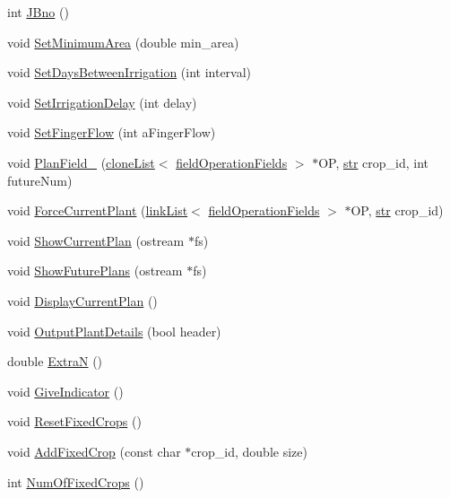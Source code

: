 \begin{DoxyCompactItemize}
\item 
int \hyperlink{classfield_aa93627cc48e5c33da7ce60ef2b06fb91}{JBno} ()
\item 
void \hyperlink{classfield_a94bf6bbab5235c10e3f495fbd4120cda}{SetMinimumArea} (double min\_\-area)
\item 
void \hyperlink{classfield_a56772aae8a615014781dbd3b400f812a}{SetDaysBetweenIrrigation} (int interval)
\item 
void \hyperlink{classfield_a5997f5906b29b4f9ebf81965c239d1b2}{SetIrrigationDelay} (int delay)
\item 
void \hyperlink{classfield_af7c73512be5fcf494c02139c141af5ea}{SetFingerFlow} (int aFingerFlow)
\item 
void \hyperlink{classfield_a2943f6f16de6cd14db847055cf7a6f0e}{PlanField\_\-} (\hyperlink{classclone_list}{cloneList}$<$ \hyperlink{classfield_operation_fields}{fieldOperationFields} $>$ $\ast$OP, \hyperlink{classfield_a6f1744c3ac290d5fc0ef66302c0ec632}{str} crop\_\-id, int futureNum)
\item 
void \hyperlink{classfield_a025a74a5935f44df084705be722fb0da}{ForceCurrentPlant} (\hyperlink{classlink_list}{linkList}$<$ \hyperlink{classfield_operation_fields}{fieldOperationFields} $>$ $\ast$OP, \hyperlink{classfield_a6f1744c3ac290d5fc0ef66302c0ec632}{str} crop\_\-id)
\item 
void \hyperlink{classfield_afa0f5c8b78d3aa7ca1f1788ee957df52}{ShowCurrentPlan} (ostream $\ast$fs)
\item 
void \hyperlink{classfield_ad6338ef1402d2bfa7837678ab9f79f41}{ShowFuturePlans} (ostream $\ast$fs)
\item 
void \hyperlink{classfield_a5c05b940e58b24dae910654ee8a4eca0}{DisplayCurrentPlan} ()
\item 
void \hyperlink{classfield_a15884755ee5efe058ae4dd8feb64594b}{OutputPlantDetails} (bool header)
\item 
double \hyperlink{classfield_aa626fa3770c1d155456d6d51e3a382a8}{ExtraN} ()
\item 
void \hyperlink{classfield_a1ea940c20a6d0f4edadaf9f2d3ebc8c1}{GiveIndicator} ()
\item 
void \hyperlink{classfield_a1546aa77b3b2f65bde8d168bb7421075}{ResetFixedCrops} ()
\item 
void \hyperlink{classfield_a361ad422a8357695a389c747024f01e8}{AddFixedCrop} (const char $\ast$crop\_\-id, double size)
\item 
int \hyperlink{classfield_ae82d54518055938a17684f162e98d5c8}{NumOfFixedCrops} ()
\item 

\end{DoxyCompactItemize}
